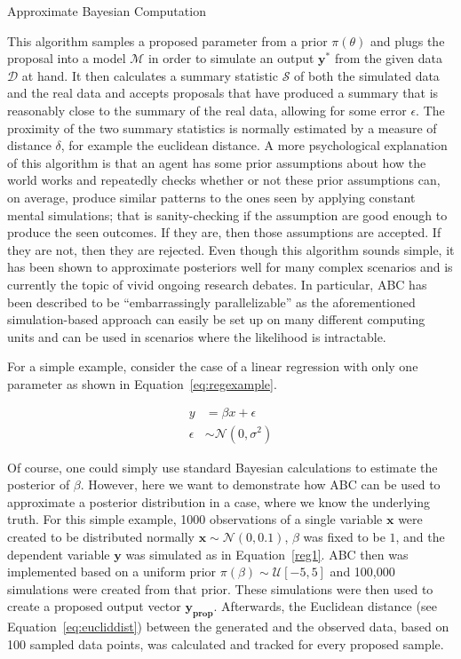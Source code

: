\documentclass[a4paper,man, natbib]{apa6}
\begin{document}
\FloatBarrier
\begin{algorithm}
\caption{Approximate Bayesian Computation}
\label{alg:abc}

\end{algorithm}
\FloatBarrier

This algorithm samples a proposed parameter from a prior $\pi(\theta)$ and plugs the proposal into a model $\mathcal{M}$ in order to simulate an output $\mathbf{y^*}$ from the given data $\mathcal{D}$ at hand. It then calculates a summary statistic $\mathcal{S}$ of both the simulated data and the real data and accepts proposals that have produced a summary that is reasonably close to the summary of the real data, allowing for some error $\epsilon$. The proximity of the two summary statistics is normally estimated by a measure of distance $\delta$, for example the euclidean distance. A more psychological explanation of this algorithm is that an agent has some prior assumptions about how the world works and repeatedly checks whether or not these prior assumptions can, on average, produce similar patterns to the ones seen by applying constant mental simulations; that is sanity-checking if the assumption are good enough to produce the seen outcomes. If they are, then those assumptions are accepted. If they are not, then they are rejected. Even though this algorithm sounds simple, it has been shown to approximate posteriors well for many complex scenarios and is currently the topic of vivid ongoing research debates. In particular, ABC has been described to be ``embarrassingly parallelizable'' as the aforementioned simulation-based approach can easily be set up on many different computing units \citep{marjoram2003markov} and can be used in scenarios where the likelihood is intractable.

For a simple example, consider the case of a linear regression with only one parameter as shown in Equation~\ref{eq:regexample}.

\begin{align}
\label{eq:regexample}
y&=\beta x +\epsilon\\
\epsilon &\sim \mathcal{N}(0,\sigma^2)
\end{align}

Of course, one could simply use standard Bayesian calculations to estimate the posterior of $\beta$. However, here we want to demonstrate how ABC can be used to approximate a posterior distribution in a case, where we know the underlying truth. For this simple example, 1000 observations of a single variable $\mathbf{x}$ were created to be distributed normally $\mathbf{x}\sim\mathcal{N}(0,0.1)$, $\beta$ was fixed to be $1$, and the dependent variable $\mathbf{y}$ was simulated as in Equation~\ref{reg1}. ABC then was implemented based on a uniform prior $\pi(\beta)\sim\mathcal{U}[-5,5]$ and 100,000 simulations were created from that prior. These simulations were then used to create a proposed output vector $\mathbf{y_{\text{prop}}}$. Afterwards, the Euclidean distance (see Equation~\ref{eq:eucliddist}) between the generated and the observed data, based on 100 sampled data points, was calculated and tracked for every proposed sample.
\end{document}
